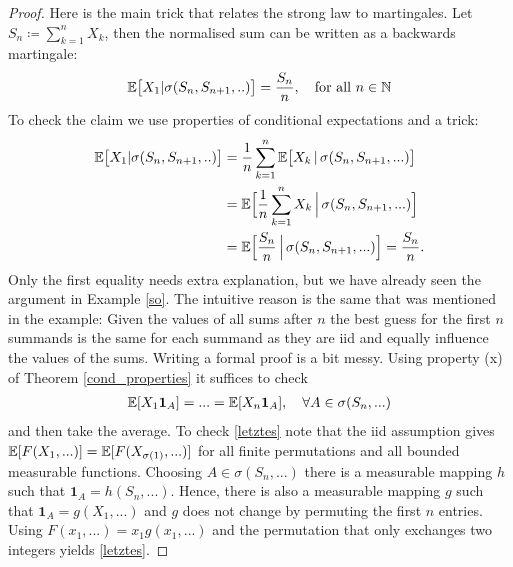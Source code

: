 \begin{proof}[Proof]
		Here is the main trick that relates the strong law to martingales. Let $S_n \coloneqq \sum\limits_{k=1}^{n}X_k$, then the normalised sum can be written as a backwards martingale:
			\begin{align*}
				\mathbb{E}\big[X_1|\sigma(S_n,S_{n+1},..)\big] = \frac{S_n}{n},\quad \text{for all } n\in\mathbb{N}
			\end{align*}
			To check the claim we use properties of conditional expectations and a trick:
			\begin{align}\label{letztes2}
			\begin{split}
				\mathbb{E}\big[X_1|\sigma(S_n,S_{n+1},..)\big] &= \frac{1}{n} \sum\limits_{k=1}^{n} \mathbb{E}\big[X_k\,|\,\sigma(S_n,S_{n+1},...)\big]\\
										&= \mathbb{E} \Big[ \frac{1}{n}\sum\limits_{k=1}^{n} X_k \,\Big|\,\sigma(S_n,S_{n+1},...)\Big] \\
										&= \mathbb{E} \Big[ \frac{S_n}{n}\,\Big|\,\sigma(S_n,S_{n+1},...)\Big]
										= \frac{S_n}{n}.
								\end{split}
			\end{align}
			Only the first equality needs extra explanation, but we have already seen the argument in Example \ref{so}. The intuitive reason is the same that was mentioned in the example: Given the values of all sums after $n$ the best guess for the first $n$ summands is the same for each summand as they are iid and equally influence the values of the sums. Writing a formal proof is a bit messy.	Using property (x) of Theorem \ref{cond_properties} it suffices to check
			\begin{align}\label{letztes}
				\mathbb{E}[X_1\mathbf 1_A]=...=\mathbb{E}[X_n\mathbf 1_A],\quad \forall A\in \sigma(S_n,...)
			\end{align}
			and then take the average. To check \eqref{letztes} note that the iid assumption gives $\mathbb{E}[F(X_1,...)]=\mathbb{E}[F(X_{\sigma(1)},...)]$ for all finite permutations and all bounded measurable functions. Choosing $A\in \sigma(S_n,...)$ there is a measurable mapping $h$ such that $\mathbf 1_A=h(S_n,...)$. Hence, there is also a measurable mapping $g$ such that $\mathbf 1_A=g(X_1,...)$ and $g$ does not change by permuting the first $n$ entries. Using $F(x_1,...)=x_1 g(x_1,...)$ and the permutation that only exchanges two integers yields \eqref{letztes}.\smallskip
			

\end{proof}
